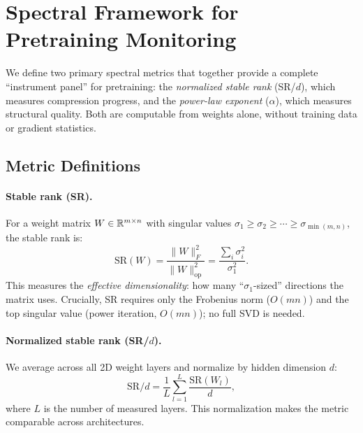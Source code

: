 \section{Spectral Framework for Pretraining Monitoring}
\label{sec:framework}

We define two primary spectral metrics that together provide a complete ``instrument panel'' for pretraining: the \emph{normalized stable rank} (SR/$d$), which measures compression progress, and the \emph{power-law exponent} ($\alpha$), which measures structural quality. Both are computable from weights alone, without training data or gradient statistics.

\subsection{Metric Definitions}
\label{sec:metrics}

\paragraph{Stable rank (SR).} For a weight matrix $W \in \mathbb{R}^{m \times n}$ with singular values $\sigma_1 \geq \sigma_2 \geq \cdots \geq \sigma_{\min(m,n)}$, the stable rank is:
\begin{equation}
    \mathrm{SR}(W) = \frac{\|W\|_F^2}{\|W\|_{\mathrm{op}}^2} = \frac{\sum_i \sigma_i^2}{\sigma_1^2}.
    \label{eq:stable_rank}
\end{equation}
This measures the \emph{effective dimensionality}: how many ``$\sigma_1$-sized'' directions the matrix uses. Crucially, SR requires only the Frobenius norm ($O(mn)$) and the top singular value (power iteration, $O(mn)$); no full SVD is needed.

\paragraph{Normalized stable rank (SR/$d$).} We average across all 2D weight layers and normalize by hidden dimension $d$:
\begin{equation}
    \mathrm{SR}/d = \frac{1}{L} \sum_{l=1}^L \frac{\mathrm{SR}(W_l)}{d},
    \label{eq:sr_norm}
\end{equation}
where $L$ is the number of measured layers. This normalization makes the metric comparable across architectures.

